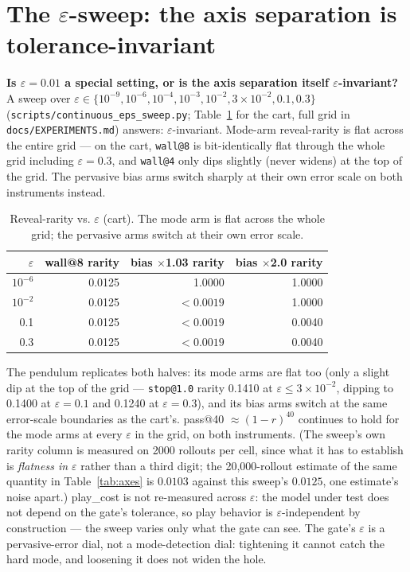 \documentclass[11pt]{article}
\theoremstyle{definition}
\theoremstyle{remark}
\begin{document}
\section{The \texorpdfstring{$\varepsilon$}{eps}-sweep: the axis separation is tolerance-invariant}
\label{sup:epssweep}

\textbf{Is $\varepsilon = 0.01$ a special setting, or is the axis separation itself $\varepsilon$-invariant?} A sweep over $\varepsilon \in \{10^{-9}, 10^{-6}, 10^{-4}, 10^{-3}, 10^{-2}, 3{\times}10^{-2}, 0.1, 0.3\}$ (\texttt{scripts/continuous\_eps\_sweep.py}; Table~\ref{tab:eps-sweep} for the cart, full grid in \texttt{docs/EXPERIMENTS.md}) answers: $\varepsilon$-invariant. Mode-arm reveal-rarity is flat across the entire grid --- on the cart, \texttt{wall@8} is bit-identically flat through the whole grid including $\varepsilon = 0.3$, and \texttt{wall@4} only dips slightly (never widens) at the top of the grid. The pervasive bias arms switch sharply at their own error scale on both instruments instead.

\begin{table}[ht]
\centering
\small
\begin{tabular}{rrrr}
\toprule
$\varepsilon$ & wall@8 rarity & bias $\times$1.03 rarity & bias $\times$2.0 rarity \\
\midrule
$10^{-6}$ & 0.0125 & 1.0000 & 1.0000 \\
$10^{-2}$ & 0.0125 & $<0.0019$ & 1.0000 \\
0.1 & 0.0125 & $<0.0019$ & 0.0040 \\
0.3 & 0.0125 & $<0.0019$ & 0.0040 \\
\bottomrule
\end{tabular}
\caption{Reveal-rarity vs. $\varepsilon$ (cart). The mode arm is flat across the whole grid; the pervasive arms switch at their own error scale.}
\label{tab:eps-sweep}
\end{table}

The pendulum replicates both halves: its mode arms are flat too (only a slight dip at the top of the grid --- \texttt{stop@1.0} rarity 0.1410 at $\varepsilon \le 3{\times}10^{-2}$, dipping to 0.1400 at $\varepsilon = 0.1$ and 0.1240 at $\varepsilon = 0.3$), and its bias arms switch at the same error-scale boundaries as the cart's. pass@40 $\approx (1-r)^{40}$ continues to hold for the mode arms at every $\varepsilon$ in the grid, on both instruments. (The sweep's own rarity column is measured on 2000 rollouts per cell, since what it has to establish is \emph{flatness in $\varepsilon$} rather than a third digit; the 20{,}000-rollout estimate of the same quantity in Table~\ref{tab:axes} is $0.0103$ against this sweep's $0.0125$, one estimate's noise apart.) play\_cost is not re-measured across $\varepsilon$: the model under test does not depend on the gate's tolerance, so play behavior is $\varepsilon$-independent by construction --- the sweep varies only what the gate can see. The gate's $\varepsilon$ is a pervasive-error dial, not a mode-detection dial: tightening it cannot catch the hard mode, and loosening it does not widen the hole.
\end{document}
